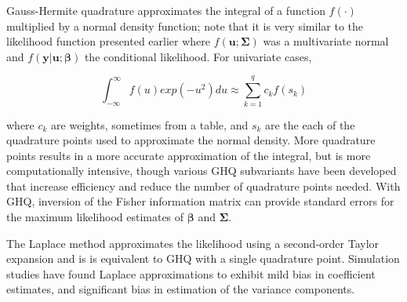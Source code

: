 \documentclass[Afour,times,sagev,doublespace]{sagej}
\begin{document}
\begin{sm}
Gauss-Hermite quadrature approximates the integral of a function $f(\cdot)$ multiplied by a normal density function; note that it is very similar to the likelihood function presented earlier where $f(\mathbf{u}; \mathbf{\Sigma})$ was a multivariate normal and $f(\mathbf{y}|\mathbf{u};\boldsymbol{\beta})$ the conditional likelihood. For univariate cases,

\begin{equation}
    \int_{-\infty}^{\infty}f(u)exp(-u^2)du \approx \sum_{k=1}^q c_kf(s_k)
\end{equation}

where $c_k$ are weights, sometimes from a table, and $s_k$ are the each of the quadrature points used to approximate the normal density. More quadrature points results in a more accurate approximation of the integral, but is more computationally intensive, though various GHQ subvariants have been developed that increase efficiency and reduce the number of quadrature points needed\cite{pinheiro_efficient_2006}. With GHQ, inversion of the Fisher information matrix can provide standard errors for the maximum likelihood estimates of $\boldsymbol{\beta}$ and $\mathbf{\Sigma}$. 


The Laplace method approximates the likelihood using a second-order Taylor expansion \cite{pinheiro_approximations_1995} and is is equivalent to GHQ with a single quadrature point\cite{liu_note_1994}. Simulation studies have found Laplace approximations to exhibit mild bias in coefficient estimates, and significant bias in estimation of the variance components\cite{pinheiro_efficient_2006}.
\end{sm}















\end{document}
